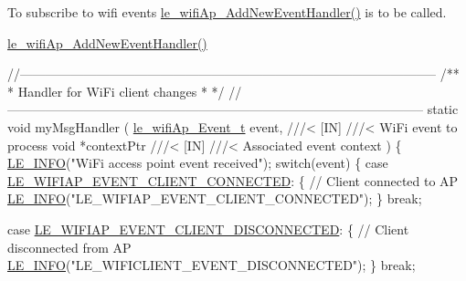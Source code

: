 To subscribe to wifi events \hyperlink{le__wifi_ap__interface_8h_a1ab6c2c710b61aa9b1abd30535702e38}{le\+\_\+wifi\+Ap\+\_\+\+Add\+New\+Event\+Handler()} is to be called.
\begin{DoxyItemize}
\item \hyperlink{le__wifi_ap__interface_8h_a1ab6c2c710b61aa9b1abd30535702e38}{le\+\_\+wifi\+Ap\+\_\+\+Add\+New\+Event\+Handler()}
\end{DoxyItemize}


\begin{DoxyCodeInclude}
\textcolor{comment}{//--------------------------------------------------------------------------------------------------}\textcolor{comment}{}
\textcolor{comment}{/**}
\textcolor{comment}{ * Handler for WiFi client changes}
\textcolor{comment}{ *}
\textcolor{comment}{ */}
\textcolor{comment}{//--------------------------------------------------------------------------------------------------}
\textcolor{keyword}{static} \textcolor{keywordtype}{void} myMsgHandler
(
    \hyperlink{le__wifi_ap__interface_8h_aeac8ad63bcfc5ee984cdd86ec9f116d5}{le\_wifiAp\_Event\_t} event,\textcolor{comment}{}
\textcolor{comment}{        ///< [IN]}
\textcolor{comment}{        ///< WiFi event to process}
\textcolor{comment}{}    \textcolor{keywordtype}{void} *contextPtr\textcolor{comment}{}
\textcolor{comment}{        ///< [IN]}
\textcolor{comment}{        ///< Associated event context}
\textcolor{comment}{})
\{
    \hyperlink{le__log_8h_a23e6d206faa64f612045d688cdde5808}{LE\_INFO}(\textcolor{stringliteral}{"WiFi access point event received"});
    \textcolor{keywordflow}{switch}(event)
    \{
        \textcolor{keywordflow}{case} \hyperlink{le__wifi_ap__interface_8h_aeac8ad63bcfc5ee984cdd86ec9f116d5a77e1636cb334d7bdde04761d333ff284}{LE\_WIFIAP\_EVENT\_CLIENT\_CONNECTED}:
        \{
            \textcolor{comment}{// Client connected to AP}
            \hyperlink{le__log_8h_a23e6d206faa64f612045d688cdde5808}{LE\_INFO}(\textcolor{stringliteral}{"LE\_WIFIAP\_EVENT\_CLIENT\_CONNECTED"});
        \}
        \textcolor{keywordflow}{break};

        \textcolor{keywordflow}{case} \hyperlink{le__wifi_ap__interface_8h_aeac8ad63bcfc5ee984cdd86ec9f116d5a6d0e05c5fb1ec89d873b96dae320ca6e}{LE\_WIFIAP\_EVENT\_CLIENT\_DISCONNECTED}:
        \{
            \textcolor{comment}{// Client disconnected from AP}
            \hyperlink{le__log_8h_a23e6d206faa64f612045d688cdde5808}{LE\_INFO}(\textcolor{stringliteral}{"LE\_WIFICLIENT\_EVENT\_DISCONNECTED"});
        \}
        \textcolor{keywordflow}{break};



\end{DoxyCodeInclude}
